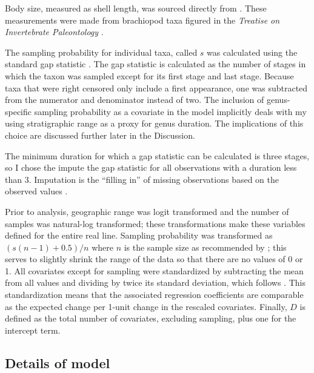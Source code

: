 \documentclass[11pt]{article}
\begin{document}
Body size, measured as shell length, was sourced directly from \citet{Payne2014}. These measurements were made from brachiopod taxa figured in the \textit{Treatise on Invertebrate Paleontology} \citep{Brunton2007}.

The sampling probability for individual taxa, called \(s\) was calculated using the standard gap statistic \citep{Foote1996e,Foote2000}. The gap statistic is calculated as the number of stages in which the taxon was sampled except for its first stage and last stage. Because taxa that were right censored only include a first appearance, one was subtracted from the numerator and denominator instead of two. The inclusion of genus-specific sampling probability as a covariate in the model implicitly deals with my using stratigraphic range as a proxy for genus duration. The implications of this choice are discussed further later in the Discussion.

The minimum duration for which a gap statistic can be calculated is three stages, so I chose the impute the gap statistic for all observations with a duration less than 3. Imputation is the ``filling in'' of missing observations based on the observed values \citep{Rubin1996,Gelman2007}.

Prior to analysis, geographic range was logit transformed and the number of samples was natural-log transformed; these transformations make these variables defined for the entire real line. Sampling probability was transformed as \((s (n - 1) + 0.5) / n\) where \(n\) is the sample size as recommended by \citet{Smithson2006}; this serves to slightly shrink the range of the data so that there are no values of 0 or 1. All covariates except for sampling were standardized by subtracting the mean from all values and dividing by twice its standard deviation, which follows \citet{Gelman2007}. This standardization means that the associated regression coefficients are comparable as the expected change per 1-unit change in the rescaled covariates. Finally, \(D\) is defined as the total number of covariates, excluding sampling, plus one for the intercept term.



\subsection*{Details of model}
\end{document}
